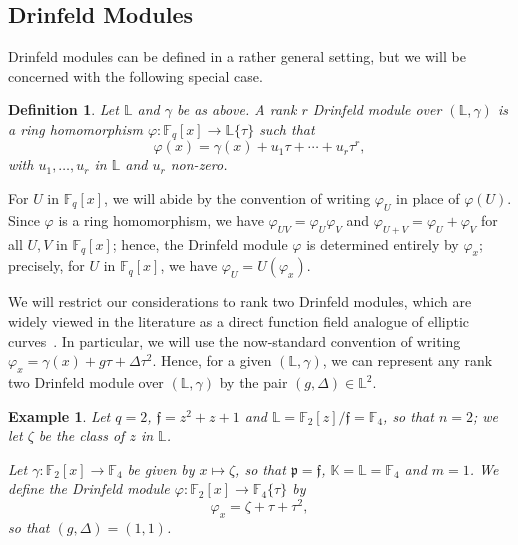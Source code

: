 \documentclass[sigconf]{acmart}
\newtheorem{definition}{Definition}
\newtheorem{example}{Example}
\newcommand{\A}{\mathbb{A}}
\newcommand{\Q}{\mathbb{Q}}
\renewcommand{\P}{\mathbb{P}}
\newcommand{\K}{\mathbb{K}}
\newcommand{\F}{\mathbb{F}}
\renewcommand{\L}{\mathbb{L}}
\newcommand{\ang}[1]{\{#1\}}
\newcommand{\frakf}{\mathfrak{f}}
\newcommand{\frakp}{\mathfrak{p}}
\begin{document}

\subsection{Drinfeld Modules}

Drinfeld modules can be defined in a rather general setting, but we
will be concerned with the following special case.

\begin{definition}\label{def:Drinfeld}
  Let $\L$ and $\gamma$ be as above.  A rank $r$ {\em Drinfeld module}
  over $(\L,\gamma)$ is a ring homomorphism $\varphi: \F_q[x] \to
  \L\ang{\tau}$ such that
  \[\varphi(x) = \gamma(x) + u_1 \tau + \cdots + u_r\tau^r,\]
  with $u_1,\dots,u_r$ in $\L$ and $u_r$ non-zero.
\end{definition}
For $U$ in $\F_q[x]$, we will abide by the convention of writing
$\varphi_U$ in place of $\varphi(U)$. Since $\varphi$ is a ring
homomorphism, we have $\varphi_{UV} = \varphi_U \varphi_V$ and
$\varphi_{U+V} = \varphi_U+ \varphi_V$ for all $U,V$ in $\F_q[x]$;
hence, the Drinfeld module $\varphi$ is determined entirely by
$\varphi_x$; precisely, for $U$ in $\F_q[x]$, we have $\varphi_U =
U(\varphi_x)$.

We will restrict our considerations to rank two Drinfeld modules,
which are widely viewed in the literature as a direct function field
analogue of elliptic curves~\cite{GEKELE1991187}. In particular, we
will use the now-standard convention of writing $\varphi_x = \gamma(x)
+ g \tau + \Delta \tau^2$. Hence, for a given $(\L,\gamma)$, we can
represent any rank two Drinfeld module over $(\L,\gamma)$ by the pair
$(g,\Delta) \in\L^2$.

\begin{example}
  Let $q = 2$, $\frakf = z^2 + z + 1$ and $\L = \F_2[z]/\frakf =
  \mathbb{F}_4$, so that $n=2$; we let $\zeta$ be the class of $z$ in
  $\L$.

  Let $\gamma: \F_2[x] \to \F_4$ be given by $x \mapsto \zeta$, so that
  $\frakp=\frakf$, $\K=\L=\F_4$ and $m=1$. We define the Drinfeld module
  $\varphi: \F_2[x] \to \F_4\ang{\tau}$ by
\[ \varphi_x = \zeta + \tau + \tau^2,\]
so that $(g,\Delta)=(1,1)$.
\end{example}

\end{document}
